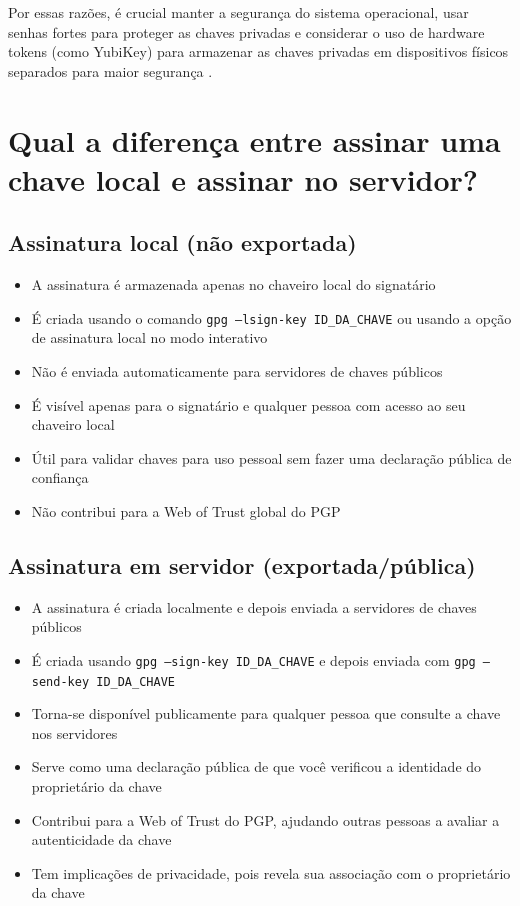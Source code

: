 Por essas razões, é crucial manter a segurança do sistema operacional, usar senhas fortes para proteger as chaves privadas e considerar o uso de hardware tokens (como YubiKey) para armazenar as chaves privadas em dispositivos físicos separados para maior segurança \cite{pgpbest}.

\section{Qual a diferença entre assinar uma chave local e assinar no servidor?}

\subsection{Assinatura local (não exportada)}
\begin{itemize}
    \item A assinatura é armazenada apenas no chaveiro local do signatário
    \item É criada usando o comando \texttt{gpg --lsign-key ID\_DA\_CHAVE} ou usando a opção de assinatura local no modo interativo
    \item Não é enviada automaticamente para servidores de chaves públicos
    \item É visível apenas para o signatário e qualquer pessoa com acesso ao seu chaveiro local
    \item Útil para validar chaves para uso pessoal sem fazer uma declaração pública de confiança
    \item Não contribui para a Web of Trust global do PGP \cite{gnupgsig}
\end{itemize}

\subsection{Assinatura em servidor (exportada/pública)}
\begin{itemize}
    \item A assinatura é criada localmente e depois enviada a servidores de chaves públicos
    \item É criada usando \texttt{gpg --sign-key ID\_DA\_CHAVE} e depois enviada com \texttt{gpg --send-key ID\_DA\_CHAVE}
    \item Torna-se disponível publicamente para qualquer pessoa que consulte a chave nos servidores
    \item Serve como uma declaração pública de que você verificou a identidade do proprietário da chave
    \item Contribui para a Web of Trust do PGP, ajudando outras pessoas a avaliar a autenticidade da chave
    \item Tem implicações de privacidade, pois revela sua associação com o proprietário da chave
\end{itemize}

